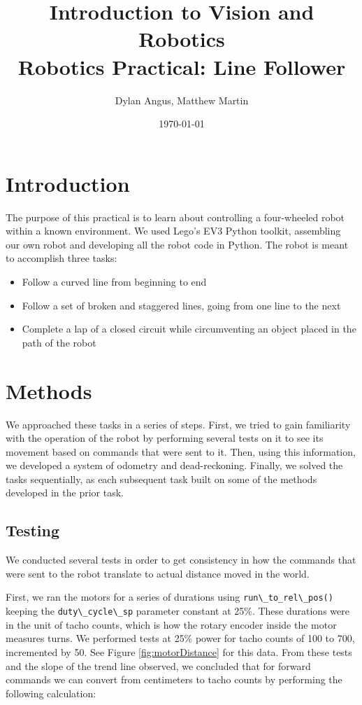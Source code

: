 \documentclass[12pt]{article}
\title{Introduction to Vision and Robotics\\Robotics Practical: Line Follower}
\author{Dylan Angus, Matthew Martin}
\date{\today}
\begin{document}
	
\newcommand{\code}[1]{
	\lstinline[basicstyle=\ttfamily]|#1|	
}

	
\maketitle

\section{Introduction}

The purpose of this practical is to learn about controlling a four-wheeled robot within a known environment. We used Lego's EV3 Python toolkit, assembling our own robot and developing all the robot code in Python. The robot is meant to accomplish three tasks:

\begin{itemize}
	\item Follow a curved line from beginning to end
	\item Follow a set of broken and staggered lines, going from one line to the next
	\item Complete a lap of a closed circuit while circumventing an object placed in the path of the robot
\end{itemize}

\section{Methods}

We approached these tasks in a series of steps. First, we tried to gain familiarity with the operation of the robot by performing several tests on it to see its movement based on commands that were sent to it. Then, using this information, we developed a system of odometry and dead-reckoning. Finally, we solved the tasks sequentially, as each subsequent task built on some of the methods developed in the prior task.

\subsection{Testing}

We conducted several tests in order to get consistency in how the commands that were sent to the robot translate to actual distance moved in the world.

First, we ran the motors for a series of durations using \code{run\_to_rel\_pos()} keeping the \code{duty\_cycle\_sp} parameter constant at 25\%. These durations were in the unit of tacho counts, which is how the rotary encoder inside the motor measures turns. We performed tests at 25\% power for tacho counts of 100 to 700, incremented by 50. See Figure \ref{fig:motorDistance} for this data. From these tests and the slope of the trend line observed, we concluded that for forward commands we can convert from centimeters to tacho counts by performing the following calculation:
\end{document}
